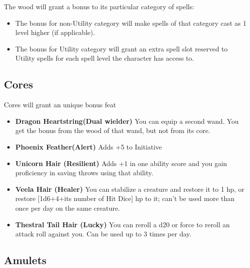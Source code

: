 The wood will grant a bonus to its particular category of spells: 

\begin{itemize}
    \item The bonus for non-Utility category will make spells of that category cast as 1 level higher (if applicable).
    \item The bonus for Utility category will grant an extra spell slot reserved to Utility spells for each spell level the character has access to.
\end{itemize}

\subsection{ Cores}
Cores will grant an unique bonus feat
\begin{itemize}
    \item \textbf{Dragon Heartstring(Dual wielder)} You can equip a second wand. You get the bonus from the wood of that wand, but not from its core.

    \item \textbf{Phoenix Feather(Alert)} Adds +5 to Initiative

    \item \textbf{Unicorn Hair (Resilient)} Adds +1 in one ability score and you gain proficiency in saving throws using that ability. 

    \item \textbf{Veela Hair (Healer)} You can stabilize a creature and restore it to 1 hp, or restore [1d6+4+its number of Hit Dice] hp to it; can't be used more than once per day on the same creature.

    \item \textbf{Thestral Tail Hair (Lucky)} You can reroll a d20 or force to reroll an attack roll against you. Can be used up to 3 times per day.

\end{itemize}

\subsection{Amulets}

